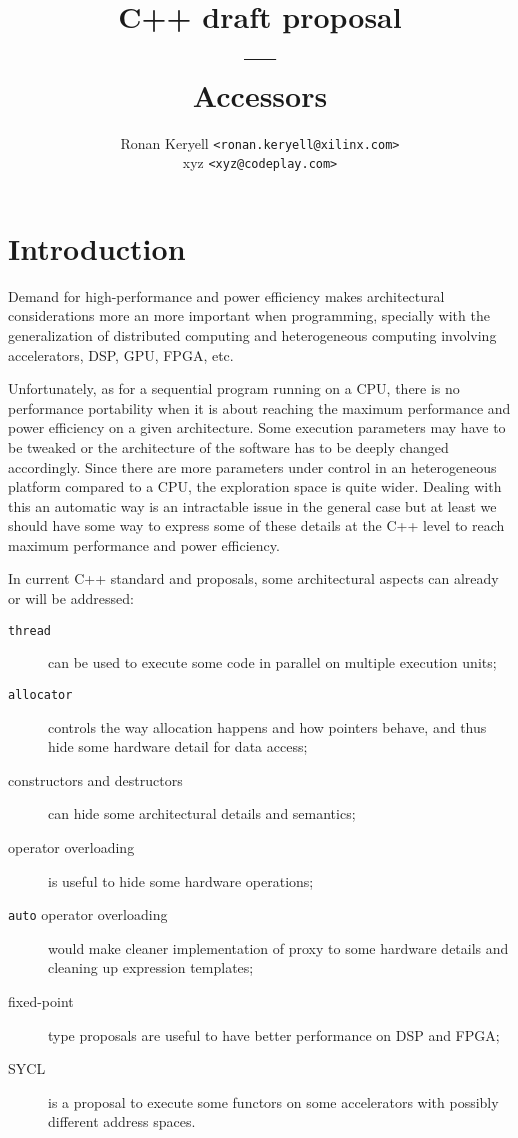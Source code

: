 \documentclass[a4paper]{article}
\title{C++ draft proposal\\
  ---\\
  Accessors}
\author{Ronan Keryell \texttt{<ronan.keryell@xilinx.com>}\\
  xyz \texttt{<xyz@codeplay.com>}}
\begin{document}
\maketitle

\section{Introduction}
\label{sec:introduction}

Demand for high-performance and power efficiency makes architectural
considerations more an more important when programming, specially with
the generalization of distributed computing and heterogeneous
computing involving accelerators, DSP, GPU, FPGA, etc.

Unfortunately, as for a sequential program running on a CPU, there is
no performance portability when it is about reaching the maximum
performance and power efficiency on a given architecture. Some
execution parameters may have to be tweaked or the architecture of the
software has to be deeply changed accordingly. Since there are more
parameters under control in an heterogeneous platform compared to a
CPU, the exploration space is quite wider. Dealing with
this an automatic way is an intractable issue in the general case but
at least we should have some way to express some of these details at
the C++ level to reach maximum performance and power efficiency.

In current C++ standard and proposals, some architectural aspects can
already or will be addressed:
\begin{description}
\item[\texttt{thread}] can be used to execute some code in parallel
  on multiple execution units;
\item[\texttt{allocator}] controls the way allocation happens and how
  pointers behave, and thus hide some hardware detail for data access;
\item[constructors and destructors] can hide some architectural details
  and semantics;
\item[operator overloading] is useful to hide some hardware
  operations;
\item[\texttt{auto} operator overloading] would make cleaner implementation of
  proxy to some hardware details and cleaning up expression templates;
\item[fixed-point] type proposals are useful to have better
  performance on DSP and FPGA;
\item[SYCL] is a proposal to execute some functors on some
  accelerators with possibly different address spaces.
\end{description}
\end{document}
